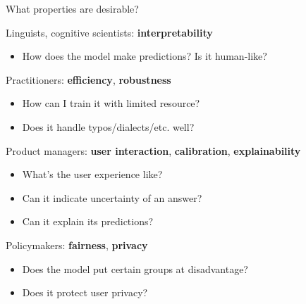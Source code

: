 \documentclass[usenames,dvipsnames,notes,11pt,aspectratio=169,hyperref={colorlinks=true, linkcolor=blue}]{beamer}
\begin{document}
\begin{frame}
    {What properties are desirable?}

    Linguists, cognitive scientists: \textbf{interpretability}\\
    \begin{itemize}
        \item How does the model make predictions? Is it human-like?
    \end{itemize}
    \pause

    Practitioners: \textbf{efficiency}, \textbf{robustness}\\
    \begin{itemize}
        \item How can I train it with limited resource?
        \item Does it handle typos/dialects/etc. well?
    \end{itemize}
    \pause

    Product managers: \textbf{user interaction}, \textbf{calibration}, \textbf{explainability}\\
    \begin{itemize}
        \item What's the user experience like?
        \item Can it indicate uncertainty of an answer? 
        \item Can it explain its predictions?
    \end{itemize}
    \pause

    Policymakers: \textbf{fairness}, \textbf{privacy}\\
    \begin{itemize}
        \item Does the model put certain groups at disadvantage?
        \item Does it protect user privacy?
    \end{itemize}
\end{frame}
\end{document}

